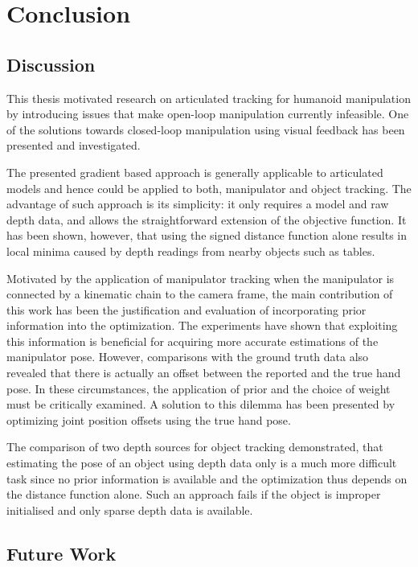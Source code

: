 \chapter{Conclusion}

\section{Discussion}

This thesis motivated research on articulated tracking for humanoid manipulation by introducing issues that make open-loop manipulation currently infeasible. One of the solutions towards closed-loop manipulation using visual feedback has been presented and investigated.

The presented gradient based approach is generally applicable to articulated models and hence could be applied to both, manipulator and object tracking. The advantage of such approach is its simplicity: it only requires a model and raw depth data, and allows the straightforward extension of the objective function.
It has been shown, however, that using the signed distance function alone results in local minima caused by depth readings from nearby objects such as tables.

Motivated by the application of manipulator tracking when the manipulator is connected by a kinematic chain to the camera frame, the main contribution of this work has been the justification and evaluation of incorporating prior information into the optimization.
The experiments have shown that exploiting this information is beneficial for acquiring more accurate estimations of the manipulator pose.
However, comparisons with the ground truth data also revealed that there is actually an offset between the reported and the true hand pose. In these circumstances, the application of prior and the choice of weight must be critically examined. A solution to this dilemma has been presented by optimizing joint position offsets using the true hand pose.

The comparison of two depth sources for object tracking demonstrated, that estimating the pose of an object using depth data only is a much more difficult task since no prior information is available and the optimization thus depends on the distance function alone. Such an approach fails if the object is improper initialised and only sparse depth data is available.


\section{Future Work}

